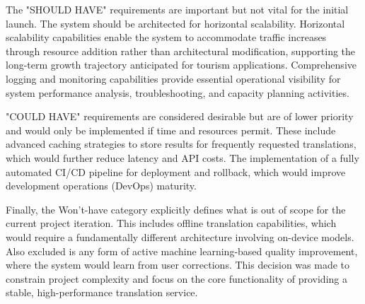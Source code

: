 The "SHOULD HAVE" requirements are important but not vital for the initial launch. The system should be architected for horizontal scalability. Horizontal scalability capabilities enable the system to accommodate traffic increases through resource addition rather than architectural modification, supporting the long-term growth trajectory anticipated for tourism applications\cite{cloudzero_horizontal_scaling}\cite{sentinelone_horizontal_scalability}. Comprehensive logging and monitoring capabilities provide essential operational visibility for system performance analysis, troubleshooting, and capacity planning activities\cite{bryant2020observability}\cite{sematext_logging_best_practices}. 

"COULD HAVE" requirements are considered desirable but are of lower priority and would only be implemented if time and resources permit. These include advanced caching strategies to store results for frequently requested translations, which would further reduce latency and API costs\cite{microsoft2022caching}\cite{tekula2024amazon}\cite{apyflux2024optimising}. The implementation of a fully automated CI/CD pipeline for deployment and rollback, which would improve development operations (DevOps) maturity\cite{zymr_devops_maturity}\cite{redhat2024cicd}\cite{testevolve2025cicd}.

Finally, the Won't-have category explicitly defines what is out of scope for the current project iteration. This includes offline translation capabilities, which would require a fundamentally different architecture involving on-device models. Also excluded is any form of active machine learning-based quality improvement, where the system would learn from user corrections. This decision was made to constrain project complexity and focus on the core functionality of providing a stable, high-performance translation service\cite{on_device_language_models}\cite{real_time_vs_offline_translation}\cite{postediting}.


